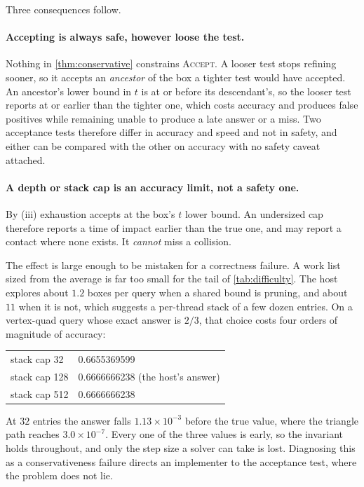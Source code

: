 Three consequences follow.

\paragraph{Accepting is always safe, however loose the test.} Nothing in
\cref{thm:conservative} constrains \textsc{Accept}. A looser test stops refining
sooner, so it accepts an \emph{ancestor} of the box a tighter test would have
accepted. An ancestor's lower bound in $t$ is at or before its descendant's, so
the looser test reports at or earlier than the tighter one, which costs accuracy
and produces false positives while remaining unable to produce a late answer or
a miss. Two acceptance tests therefore differ in accuracy and speed and
not in safety, and either can be compared with the other on accuracy with no
safety caveat attached.

\paragraph{A depth or stack cap is an accuracy limit, not a safety one.} By
(iii) exhaustion accepts at the box's $t$ lower bound. An undersized cap
therefore reports a time of impact earlier than the true one, and may report a
contact where none exists. It \emph{cannot} miss a collision.

The effect is large enough to be mistaken for a correctness failure. A work list
sized from the average is far too small for the tail of \cref{tab:difficulty}.
The host explores about $1.2$ boxes per query when a shared bound is pruning,
and about $11$ when it is not, which suggests a per-thread stack of a few dozen
entries. On a vertex-quad query whose exact answer is $2/3$, that choice costs
four orders of magnitude of accuracy:
\begin{center}\ttfamily
\begin{tabular}{ll}
stack cap 32  & 0.6655369599 \\
stack cap 128 & 0.6666666238 \quad\rm(the host's answer)\\
stack cap 512 & 0.6666666238 \\
\end{tabular}
\end{center}
At $32$ entries the answer falls $1.13\times10^{-3}$ before the true value, where
the triangle path reaches $3.0\times10^{-7}$. Every one of the three values is
early, so the invariant holds throughout, and only the step size a solver can
take is lost. Diagnosing this as a conservativeness failure directs an
implementer to the acceptance test, where the problem does not lie.


